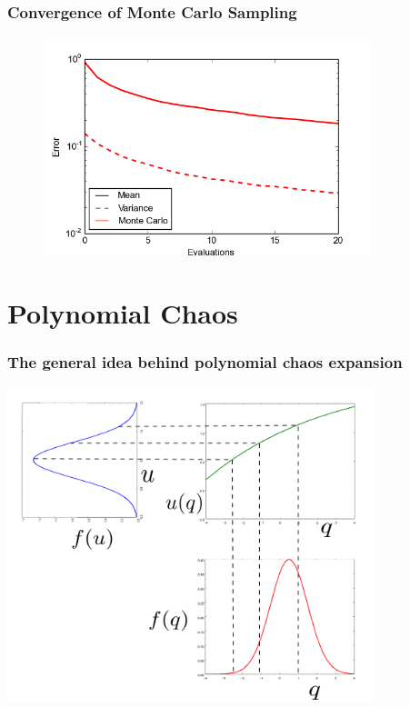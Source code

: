 \documentclass{beamer}
\begin{document}
\begin{frame}
  \frametitle{Convergence of Monte Carlo Sampling}
  \begin{figure}
    \includegraphics[width=0.85\textwidth]{MC_convergence_1D_1.png}
  \end{figure}
\end{frame}



\section{Polynomial Chaos}


\begin{frame}
  \frametitle{The general idea behind polynomial chaos expansion}
   \includegraphics[width=0.8\textwidth]{mapping.png}
\end{frame}
\end{document}
